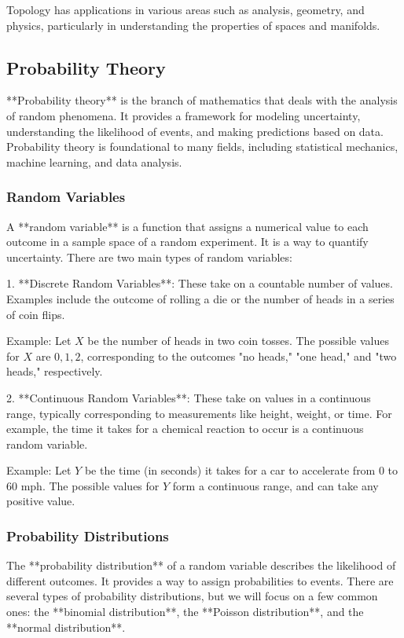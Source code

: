 \documentclass{article}
\begin{document}
Topology has applications in various areas such as analysis, geometry, and physics, particularly in understanding the properties of spaces and manifolds.

\subsection{Probability Theory}

**Probability theory** is the branch of mathematics that deals with the analysis of random phenomena. It provides a framework for modeling uncertainty, understanding the likelihood of events, and making predictions based on data. Probability theory is foundational to many fields, including statistical mechanics, machine learning, and data analysis.

\subsubsection*{Random Variables}

A **random variable** is a function that assigns a numerical value to each outcome in a sample space of a random experiment. It is a way to quantify uncertainty. There are two main types of random variables:

1. **Discrete Random Variables**: These take on a countable number of values. Examples include the outcome of rolling a die or the number of heads in a series of coin flips.

   Example: Let \( X \) be the number of heads in two coin tosses. The possible values for \( X \) are \( 0, 1, 2 \), corresponding to the outcomes "no heads," "one head," and "two heads," respectively.

2. **Continuous Random Variables**: These take on values in a continuous range, typically corresponding to measurements like height, weight, or time. For example, the time it takes for a chemical reaction to occur is a continuous random variable.

   Example: Let \( Y \) be the time (in seconds) it takes for a car to accelerate from 0 to 60 mph. The possible values for \( Y \) form a continuous range, and can take any positive value.

\subsubsection*{Probability Distributions}

The **probability distribution** of a random variable describes the likelihood of different outcomes. It provides a way to assign probabilities to events. There are several types of probability distributions, but we will focus on a few common ones: the **binomial distribution**, the **Poisson distribution**, and the **normal distribution**.
\end{document}
